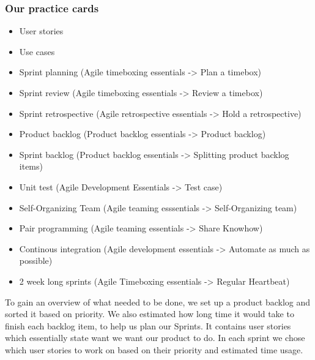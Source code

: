 \subsubsection{Our practice cards}
\begin{itemize}
    \item User stories
    \item Use cases
    \item Sprint planning (Agile timeboxing essentials -> Plan a timebox)
    \item Sprint review (Agile timeboxing essentials -> Review a timebox)
    \item Sprint retrospective (Agile retrospective essentials -> Hold a retrospective)
    \item Product backlog (Product backlog essentials -> Product backlog)
    \item Sprint backlog (Product backlog essentials -> Splitting product backlog items)
    \item Unit test (Agile Development Essentials -> Test case)
    \item Self-Organizing Team (Agile teaming esssentials -> Self-Organizing team)
    \item Pair programming (Agile teaming essentials -> Share Knowhow)
    \item Continous integration (Agile development essentials -> Automate as much as possible)
    \item 2 week long sprints (Agile Timeboxing essentials -> Regular Heartbeat)
\end{itemize}
To gain an overview of what needed to be done, we set up a product backlog and sorted it based on priority. We also estimated how long time it would take to finish each backlog item, to help us plan our Sprints. It contains user stories which essentially state want we want our product to do. In each sprint we chose which user stories to work on based on their priority and estimated time usage.

